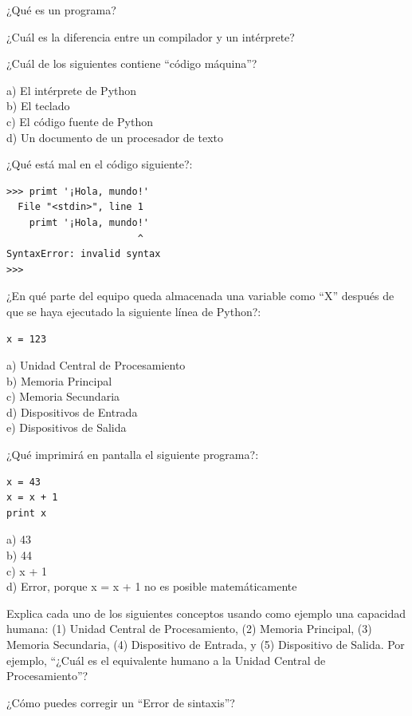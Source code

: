 \begin{ex}
¿Qué es un programa?
\end{ex}

\begin{ex}
¿Cuál es la diferencia entre un compilador y un intérprete?
\end{ex}

\begin{ex}
¿Cuál de los siguientes contiene ``código máquina''?

a) El intérprete de Python\\
b) El teclado\\
c) El código fuente de Python\\
d) Un documento de un procesador de texto
\end{ex}

\begin{ex}
¿Qué está mal en el código siguiente?:

\beforeverb
\begin{verbatim}
>>> primt '¡Hola, mundo!'
  File "<stdin>", line 1
    primt '¡Hola, mundo!'
                       ^
SyntaxError: invalid syntax
>>> 
\end{verbatim}
\afterverb

\end{ex}

\begin{ex}
¿En qué parte del equipo queda almacenada una variable como ``X''
después de que se haya ejecutado la siguiente línea de Python?:

\beforeverb
\begin{verbatim}
x = 123
\end{verbatim}
\afterverb
%
a) Unidad Central de Procesamiento\\
b) Memoria Principal\\
c) Memoria Secundaria\\
d) Dispositivos de Entrada\\
e) Dispositivos de Salida
\end{ex}

\begin{ex}
¿Qué imprimirá en pantalla el siguiente programa?:

\beforeverb
\begin{verbatim}
x = 43
x = x + 1
print x
\end{verbatim}
\afterverb
%
a) 43\\
b) 44\\
c) x + 1\\
d) Error, porque x = x + 1 no es posible matemáticamente
\end{ex}

\begin{ex}
Explica cada uno de los siguientes conceptos usando como ejemplo una capacidad humana:
(1) Unidad Central de Procesamiento, (2) Memoria Principal, (3) Memoria Secundaria, 
(4) Dispositivo de Entrada, y
(5) Dispositivo de Salida.
Por ejemplo, ``¿Cuál es el equivalente humano a la Unidad Central de Procesamiento''? 
\end{ex}

\begin{ex}
¿Cómo puedes corregir un ``Error de sintaxis''?
\end{ex}